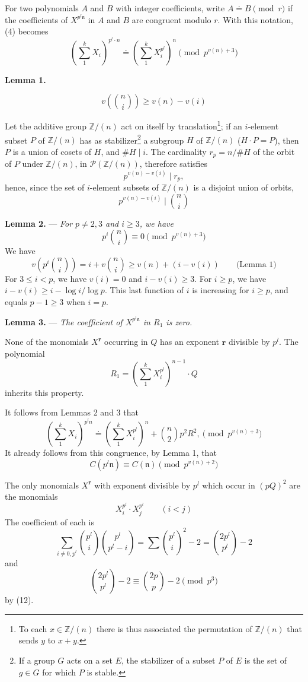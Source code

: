\documentclass[10pt]{article}
\newcommand{\Z}{\mathbb Z}
\newcommand{\dd}{\mathrel{\doteq}}
\newcommand{\nn}{\mathfrak n}
\newcommand{\rr}{\mathbf r}
\begin{document}
For two polynomials $A$ and $B$ with integer coefficients, write $A\dd B\pmod r$ if the coefficients of $X^{p^l\nn}$ in $A$ and $B$ are congruent modulo $r$. With this notation, (4) becomes
\[
\left(\sum_{1}^k X_i\right)^{p^l\cdot n}
\dd
\left(\sum_{1}^k X_i^{p^l}\right)^n
\pmod {p^{v(n)+3}} \tag{8}
\]

\par\medskip\noindent\textbf{Lemma 1.}\par\nobreak\smallskip
\[
v\left(\binom ni\right) \ge v(n)-v(i) \tag{9}
\]

Let the additive group $\Z/(n)$ act on itself by translation\footnote{To each $x\in\Z/(n)$ there is thus associated the permutation of $\Z/(n)$ that sends $y$ to $x+y$.}; if an $i$-element subset $P$ of $\Z/(n)$ has as stabilizer\footnote{If a group $G$ acts on a set $E$, the stabilizer of a subset $P$ of $E$ is the set of $g\in G$ for which $P$ is stable.} a subgroup $H$ of $\Z/(n)$ ($H\cdot P=P$), then $P$ is a union of cosets of $H$, and $\#H\mid i$. The cardinality $r_p=n/\#H$ of the orbit of $P$ under $\Z/(n)$, in $\mathcal P(\Z/(n))$, therefore satisfies
\[
p^{v(n)-v(i)}\mid r_p,
\]
hence, since the set of $i$-element subsets of $\Z/(n)$ is a disjoint union of orbits,
\[
p^{v(n)-v(i)}\mid\binom ni
\]

\par\medskip\noindent\textbf{Lemma 2.} --- \textit{For $p\ne2,3$ and $i\ge3$, we have}
\[
p^i\binom ni\equiv0\pmod {p^{v(n)+3}} \tag{10}
\]
We have
\[
v\left(p^i\binom ni\right)
=i+v\binom ni
\ge v(n)+(i-v(i))\qquad\text{(Lemma 1)}
\]
For $3\le i<p$, we have $v(i)=0$ and $i-v(i)\ge3$. For $i\ge p$, we have $i-v(i)\ge i-\log i/\log p$. This last function of $i$ is increasing for $i\ge p$, and equals $p-1\ge3$ when $i=p$.

\par\medskip\noindent\textbf{Lemma 3.} --- \textit{The coefficient of $X^{p^l\nn}$ in $R_1$ is zero.}

None of the monomials $X^\rr$ occurring in $Q$ has an exponent $\rr$ divisible by $p^l$. The polynomial
\[
R_1=\left(\sum_{1}^k X_i^{p^l}\right)^{n-1}\cdot Q
\]
inherits this property.

It follows from Lemmas 2 and 3 that
\[
\left(\sum_{1}^k X_i\right)^{p^l n}
\dd
\left(\sum_{1}^k X_i^{p^l}\right)^n
+\binom n2 p^2R^2,
\pmod {p^{v(n)+3}} \tag{11}
\]
It already follows from this congruence, by Lemma 1, that
\[
C(p^l\nn)\equiv C(\nn)\pmod {p^{v(n)+2}} \tag{12}
\]

The only monomials $X^\rr$ with exponent divisible by $p^l$ which occur in $(pQ)^2$ are the monomials
\[
X_i^{p^l}\cdot X_j^{p^l}\qquad(i<j)
\]
The coefficient of each is
\[
\sum_{i\ne0,p^l}\binom{p^l}{i}\binom{p^l}{p^l-i}
=
\sum \binom{p^l}{i}^2-2
=
\binom{2p^l}{p^l}-2 \tag{13}
\]
and
\[
\binom{2p^l}{p^l}-2
\equiv
\binom{2p}{p}-2
\pmod {p^3}
\]
by (12).
\end{document}
